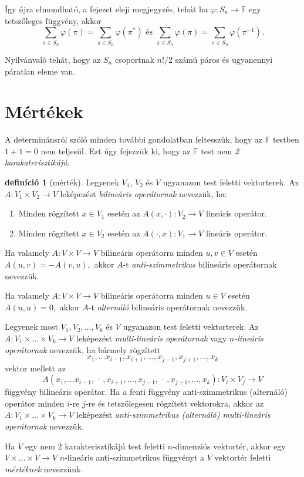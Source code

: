 \documentclass[a4paper, showtrims]{memoir}
\theoremstyle{plain}
\theoremstyle{remark}
\theoremstyle{definition}
\newtheorem{definition}[proposition]{definíció}
\begin{document}
Így újra elmondható, a fejezet eleji megjegyzés,
tehát ha $\varphi:S_n\to\mathbb{F}$ egy tetszőleges függvény, akkor
\[
	\sum_{\pi\in S_n}\varphi\left( \pi \right)
	=
	\sum_{\pi\in S_n}\varphi\left( \pi^\ast \right)
    \text{ és }
	\sum_{\pi\in S_n}\varphi\left( \pi \right)
	=
    \sum_{\pi\in S_n}\varphi\left( \pi^{-1} \right).
\]

Nyilvánvaló tehát, hogy az $S_n$ csoportnak $n!/2$ számú páros és ugyanennyi páratlan eleme van.
\section{Mértékek}
A determinánsról szóló minden további gondolatban feltesszük,
hogy az $\mathbb{F}$ testben $1+1=0$ nem teljesül.
Ezt úgy fejezzük ki, hogy az $\mathbb{F}$ test nem \emph{2 karakaterisztikájú}.
\begin{definition}[mérték]
	Legyenek $V_{1}$, $V_{2}$ és $V$ ugyanazon test feletti vektorterek.
	Az $A:V_{1}\times V_{2}\rightarrow V$ leképezést \emph{bilineáris operátornak}
	nevezzük, ha:
	\begin{enumerate}
		\item
		      Minden rögzített $x\in V_{1}$ esetén az $A\left( x,\cdot \right):V_{2}\rightarrow V$ lineáris operátor.
		\item
		      Minden rögzített $x\in V_{2}$ esetén az $A\left( \cdot ,x\right):V_{1}\rightarrow V$ lineáris operátor.
	\end{enumerate}

	Ha valamely $A:V\times V\rightarrow V$ bilineáris operátorra minden $u,v\in V$ esetén
	\(
	A\left( u,v\right) =-A\left( v,u\right),
	\)
	akkor $A$-t \emph{anti-szimmetrikus} bilineáris operátornak nevezzük.

	Ha valamely $A:V\times V\rightarrow V$ bilineáris operátorra minden $u\in V$ esetén
	\(
	A\left( u,u\right) = 0,
	\)
	akkor $A$-t \emph{alternáló} bilineáris operátornak nevezzük.

	Legyenek most $V_{1},V_{2},\ldots ,V_{k}$ és $V$ ugyanazon test feletti vektorterek.
	Az $A:V_{1}\times \ldots \times V_{k}\rightarrow V$ leképezést \emph{multi-lineáris operátornak}
	vagy $n$\emph{-lineáris operátornak }nevezzük,
	ha bármely rögzített
	\[
		x_{1},\ldots x_{i-1},x_{i+1},\ldots ,x_{j-1},x_{j+1},\ldots ,x_{k}
	\]
	vektor mellett az
	\[
		A\left( x_{1},\ldots x_{i-1},\,\cdot\, ,x_{i+1},\ldots ,x_{j-1},\,\cdot\, ,x_{j+1},\ldots ,x_{k}\right)
		:
		V_{i}\times V_{j}\rightarrow V
	\]
	függvény bilineáris operátor.
	Ha a fenti függvény anti-szimmetrikus (alternáló) operátor minden $i$-re $j$-re és tetszőlegesen rögzített vektorokra,
	akkor az
	$A:V_{1}\times \ldots \times V_{k}\rightarrow V$
	leképezést \emph{anti-szimmetrikus (alternáló) multi-lineáris operátornak} nevezzük.

	Ha $V$ egy nem 2 karakterisztikájú test feletti $n$-dimenziós vektortér,
	akkor egy $V\times \dots \times V\to V$ $n$-lineáris anti-szimmetrikus függvényt
	a $V$ vektortér feletti \emph{mértéknek} nevezzünk.
\end{definition}
\end{document}
